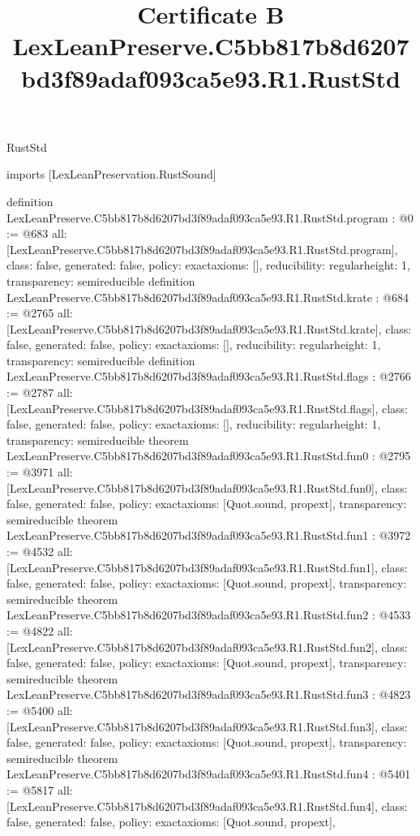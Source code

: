 \begin{lexlean}{RustStd}
\title{Certificate B LexLeanPreserve.C5bb817b8d6207bd3f89adaf093ca5e93.R1.RustStd}
\begin{coremodule}
imports [LexLeanPreservation.RustSound]

definition LexLeanPreserve.C5bb817b8d6207bd3f89adaf093ca5e93.R1.RustStd.program : @0 := @683 {
  all: [LexLeanPreserve.C5bb817b8d6207bd3f89adaf093ca5e93.R1.RustStd.program],
  class: false,
  generated: false,
  policy: exact{axioms: []},
  reducibility: regular{height: 1},
  transparency: semireducible
}
definition LexLeanPreserve.C5bb817b8d6207bd3f89adaf093ca5e93.R1.RustStd.krate : @684 := @2765 {
  all: [LexLeanPreserve.C5bb817b8d6207bd3f89adaf093ca5e93.R1.RustStd.krate],
  class: false,
  generated: false,
  policy: exact{axioms: []},
  reducibility: regular{height: 1},
  transparency: semireducible
}
definition LexLeanPreserve.C5bb817b8d6207bd3f89adaf093ca5e93.R1.RustStd.flags : @2766 := @2787 {
  all: [LexLeanPreserve.C5bb817b8d6207bd3f89adaf093ca5e93.R1.RustStd.flags],
  class: false,
  generated: false,
  policy: exact{axioms: []},
  reducibility: regular{height: 1},
  transparency: semireducible
}
theorem LexLeanPreserve.C5bb817b8d6207bd3f89adaf093ca5e93.R1.RustStd.fun0 : @2795 := @3971 {
  all: [LexLeanPreserve.C5bb817b8d6207bd3f89adaf093ca5e93.R1.RustStd.fun0],
  class: false,
  generated: false,
  policy: exact{axioms: [Quot.sound, propext]},
  transparency: semireducible
}
theorem LexLeanPreserve.C5bb817b8d6207bd3f89adaf093ca5e93.R1.RustStd.fun1 : @3972 := @4532 {
  all: [LexLeanPreserve.C5bb817b8d6207bd3f89adaf093ca5e93.R1.RustStd.fun1],
  class: false,
  generated: false,
  policy: exact{axioms: [Quot.sound, propext]},
  transparency: semireducible
}
theorem LexLeanPreserve.C5bb817b8d6207bd3f89adaf093ca5e93.R1.RustStd.fun2 : @4533 := @4822 {
  all: [LexLeanPreserve.C5bb817b8d6207bd3f89adaf093ca5e93.R1.RustStd.fun2],
  class: false,
  generated: false,
  policy: exact{axioms: [Quot.sound, propext]},
  transparency: semireducible
}
theorem LexLeanPreserve.C5bb817b8d6207bd3f89adaf093ca5e93.R1.RustStd.fun3 : @4823 := @5400 {
  all: [LexLeanPreserve.C5bb817b8d6207bd3f89adaf093ca5e93.R1.RustStd.fun3],
  class: false,
  generated: false,
  policy: exact{axioms: [Quot.sound, propext]},
  transparency: semireducible
}
theorem LexLeanPreserve.C5bb817b8d6207bd3f89adaf093ca5e93.R1.RustStd.fun4 : @5401 := @5817 {
  all: [LexLeanPreserve.C5bb817b8d6207bd3f89adaf093ca5e93.R1.RustStd.fun4],
  class: false,
  generated: false,
  policy: exact{axioms: [Quot.sound, propext]},
}
\end{coremodule}
\end{lexlean}
